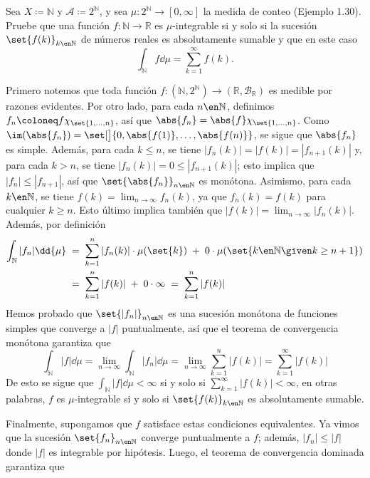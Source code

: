 \setcounter{neje}{60}
\begin{nejer}[Repetido]
Sea $X \coloneq \mathbb{N}$ y $\mathcal{A} \coloneq 2^{\mathbb{N}}$, y sea $\mu\colon 2^{\mathbb{N}} \to [0, \infty]$ la medida de conteo (Ejemplo 1.30). Pruebe que una función $f \colon \mathbb{N} \to \mathbb{R}$ es $\mu$-integrable si y solo si la sucesión $\set{f(k)}_{k \en \mathbb{N}}$ de números reales es absolutamente sumable y que en este caso
$$
\int_{\mathbb{N}} f \dd{\mu} = \sum_{k=1}^{\infty} f(k).
$$
\end{nejer}
\begin{sol}
Primero notemos que toda función $f\colon (\mathbb{N},2^\mathbb{N}) \to (\mathbb{R}, \mathcal{B}_\mathbb{R})$ es medible por razones evidentes. Por otro lado, para cada $n\en\mathbb{N}$, definimos $f_n \coloneq f\chi_{\set{1,\dots,n}}$, así que $\abs{f_n} = \abs{f}\chi_{\set{1,\dots,n}}$.
Como $\im(\abs{f_n}) = \set[\big]{0,\abs{f(1)},\dots,\abs{f(n)}}$, se sigue que $\abs{f_n}$ es simple. Además, para cada $k \leq n$, se tiene $|f_n(k)| = |f(k)| = |f_{n+1}(k)|$ y, para cada $k>n$, se tiene $|f_n(k)| = 0 \leq |f_{n+1}(k)|$; esto implica que $|f_n| \leq |f_{n+1}|$, así que $\set{\abs{f_n}}_{n\en\mathbb{N}}$ es monótona. Asimismo, para cada $k\en\mathbb{N}$, se tiene $f(k) = \lim_{n\to\infty}f_n(k)$, ya que $f_n(k) = f(k)$ para cualquier $k\geq n$. Esto último implica también que $|f(k)| = \lim_{n\to\infty}|f_n(k)|$. Además, por definición
\begin{align*}
    \int_\mathbb{N}|f_n|\dd{\mu}%
    &\;=\; \sum^n_{k=1}|f_n(k)|\cdot\mu(\set{k}) \;+\; 0\cdot\mu(\set{k\en\mathbb{N} \given k\geq n+1})\\
    &\;=\; \sum^n_{k=1}|f(k)| \;+\; 0\cdot\infty%
    \;=\; \sum^n_{k=1}|f(k)|
\end{align*}
Hemos probado que $\set{|f_n|}_{n\en\mathbb{N}}$ es una sucesión monótona de funciones simples que converge a $|f|$ puntualmente, así que el teorema de convergencia monótona garantiza que
\[
\int_\mathbb{N}|f|\dd{\mu} = \lim_{n\to\infty}\int_\mathbb{N}|f_n|\dd{\mu} = \lim_{n\to\infty}\sum^n_{k=1}|f(k)| = \sum^\infty_{k=1}|f(k)|
\]
De esto se sigue que $\int_\mathbb{N}|f|\dd{\mu} < \infty$ si y solo si $\sum^\infty_{k=1}|f(k)| < \infty$, en otras palabras, $f$ es $\mu$-integrable si y solo si $\set{f(k)}_{k\en\mathbb{N}}$ es absolutamente sumable.\par
Finalmente, supongamos que $f$ satisface estas condiciones equivalentes. Ya vimos que la sucesión $\set{f_n}_{n\en\mathbb{N}}$ converge puntualmente a $f$; además, $|f_n| \leq |f|$ donde $|f|$ es integrable por hipótesis. Luego, el teorema de convergencia dominada garantiza que 

\end{sol}

